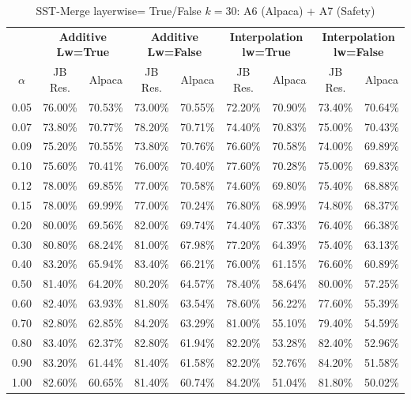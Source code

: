 \begin{table}[h]
\centering
\caption{SST-Merge layerwise= True/False $k=30$: A6 (Alpaca) + A7 (Safety)}
\label{tab:res_a6_a7_sst_30}
\begin{tabular}{c|cc|cc|cc|cc}
\hline
 & \multicolumn{2}{c|}{\textbf{Additive Lw=True}} & \multicolumn{2}{c|}{\textbf{Additive Lw=False}} & \multicolumn{2}{c|}{\textbf{Interpolation lw=True}}& \multicolumn{2}{c}{\textbf{Interpolation lw=False}} \\
$\alpha$ & JB Res. & Alpaca & JB Res. & Alpaca & JB Res. & Alpaca & JB Res. & Alpaca \\
\hline
0.05 & 76.00\% & 70.53\% & 73.00\% & 70.55\% & 72.20\% & 70.90\% & 73.40\% & 70.64\% \\
0.07 & 73.80\% & 70.77\% & 78.20\% & 70.71\% & 74.40\% & 70.83\% & 75.00\% & 70.43\% \\
0.09 & 75.20\% & 70.55\% & 73.80\% & 70.76\% & 76.60\% & 70.58\% & 74.00\% & 69.89\% \\
0.10 & 75.60\% & 70.41\% & 76.00\% & 70.40\% & 77.60\% & 70.28\% & 75.00\% & 69.83\% \\
0.12 & 78.00\% & 69.85\% & 77.00\% & 70.58\% & 74.60\% & 69.80\% & 75.40\% & 68.88\% \\
0.15 & 78.00\% & 69.99\% & 77.00\% & 70.24\% & 76.80\% & 68.99\% & 74.80\% & 68.37\% \\
0.20 & 80.00\% & 69.56\% & 82.00\% & 69.74\% & 74.40\% & 67.33\% & 76.40\% & 66.38\% \\
0.30 & 80.80\% & 68.24\% & 81.00\% & 67.98\% & 77.20\% & 64.39\% & 75.40\% & 63.13\% \\
0.40 & 83.20\% & 65.94\% & 83.40\% & 66.21\% & 76.00\% & 61.15\% & 76.60\% & 60.89\% \\
0.50 & 81.40\% & 64.20\% & 80.20\% & 64.57\% & 78.40\% & 58.64\% & 80.00\% & 57.25\% \\
0.60 & 82.40\% & 63.93\% & 81.80\% & 63.54\% & 78.60\% & 56.22\% & 77.60\% & 55.39\% \\
0.70 & 82.80\% & 62.85\% & 84.20\% & 63.29\% & 81.00\% & 55.10\% & 79.40\% & 54.59\% \\
0.80 & 83.40\% & 62.37\% & 82.80\% & 61.94\% & 82.20\% & 53.28\% & 82.40\% & 52.96\% \\
0.90 & 83.20\% & 61.44\% & 81.40\% & 61.58\% & 82.20\% & 52.76\% & 84.20\% & 51.58\% \\
1.00 & 82.60\% & 60.65\% & 81.40\% & 60.74\% & 84.20\% & 51.04\% & 81.80\% & 50.02\% \\
\hline
\end{tabular}
\end{table}
\FloatBarrier

